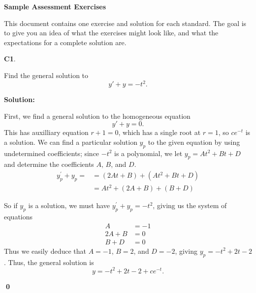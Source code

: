 \documentclass{article}
\newenvironment{problem}[1]
{
  \begin{flushleft}
  \textbf{#1}.
  \ignorespaces
}
{
  \end{flushleft}
}
\newenvironment{solution}
{
  \ignorespaces
  \textbf{Solution:}
}
{
  \ignorespacesafterend
  \begin{flushright}
  {\bfseries \qed}
  \end{flushright}
}
\begin{document}
\begin{center}
\Large \textbf{Sample Assessment Exercises}
\end{center}

This document contains one exercise and solution for each standard.
The goal is to give you an idea of what the exercises might look like,
and what the expectations for a complete solution are.

\begin{problem}{C1}
Find the general solution to \[y'+y=-t^2.\]
\end{problem}
\begin{solution}
First, we find a general solution to the homogeneous equation \[y'+y=0.\]  This has auxilliary equation \(r+1=0\), which has a single root at \(r=1\), so \(ce^{-t}\) is a solution.  We can find a particular solution \(y_p\) to the given equation by using undetermined coefficients; since \(-t^2\) is a polynomial, we let \(y_p = At^2+Bt+D\) and determine the coefficients \(A\), \(B\), and \(D\).  
\begin{align*}
y_p ^\prime +y_p= &= (2At+B)+(At^2+Bt+D) \\
&= At^2+(2A+B)+(B+D)
\end{align*}

So if \(y_p\) is a solution, we must have \(y_p ^\prime+y_p = -t^2\), giving us the system of equations
\begin{align*}
A&=-1 \\ 2A+B &= 0 \\ B+D&=0
\end{align*}
Thus we easily deduce that \(A=-1\), \(B=2\), and \(D=-2\), giving \(y_p = -t^2+2t-2\).  Thus, the general solution is
\[y = -t^2+2t-2+ce^{-t}.\]
\end{solution}
\end{document}
